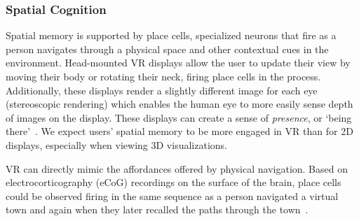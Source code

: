 \documentclass[conference]{IEEEtran}
\begin{document}
\subsubsection{Spatial Cognition}
Spatial memory is supported by place cells, specialized neurons that fire as a person navigates through a physical space and other contextual cues in the environment.  
Head-mounted VR displays allow the user to update their view by moving their body or rotating their neck, firing place cells in the process.
Additionally, these displays render a slightly different image for each eye (stereoscopic rendering) which enables the human eye to more easily sense depth of images on the display.
These displays can create a sense of \emph{presence}, or `being there'~\cite{Slater:PlaceInVR}.
We expect users' spatial memory to be more engaged in VR than for 2D displays, especially when viewing 3D visualizations.


VR can directly mimic the affordances offered by physical navigation. Based on electrocorticography (eCoG) recordings on the surface of the brain, place cells could be observed firing in the same sequence as a person navigated a virtual town and again when they later recalled the paths through the town~\cite{Ekstrom:2003}.



\end{document}
